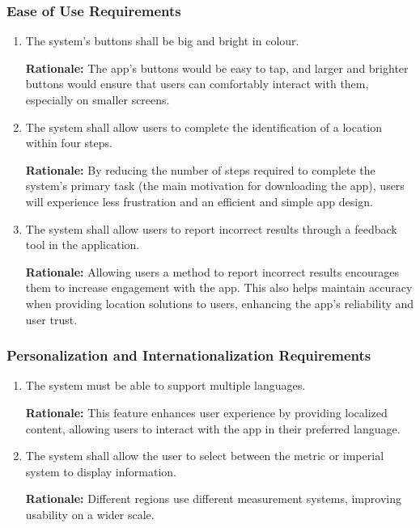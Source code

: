 \documentclass[]{article}
\begin{document}
\subsubsection{Ease of Use Requirements}
\label{ssub:ease_of_use_requirements}
\begin{enumerate}[{UH-EOU}1. ]
	\item The system's buttons shall be big and bright in colour.
		
	{\bf Rationale:} The app's buttons would be easy to tap, and larger and brighter buttons would ensure that users can comfortably interact with them, especially on smaller screens.
	\item The system shall allow users to complete the identification of a location within four steps.
		
	{\bf Rationale:} By reducing the number of steps required to complete the system's primary task (the main motivation for downloading the app), users will experience less frustration and an efficient and simple app design.
	\item The system shall allow users to report incorrect results through a feedback tool in the application.
	
	{\bf Rationale:} Allowing users a method to report incorrect results encourages them to increase engagement with the app. This also helps maintain accuracy when providing location solutions to users, enhancing the app's reliability and user trust.
\end{enumerate}

\subsubsection{Personalization and Internationalization Requirements}
\label{ssub:personalization_and_internationalization_requirements}
\begin{enumerate}[{UH-PI}1. ]
	\item The system must be able to support multiple languages.
		
	{\bf Rationale:} This feature enhances user experience by providing localized content, allowing users to interact with the app in their preferred language.
	\item The system shall allow the user to select between the metric or imperial system to display information.
	
	{\bf Rationale:} Different regions use different measurement systems, improving usability on a wider scale.
\end{enumerate}
\end{document}
